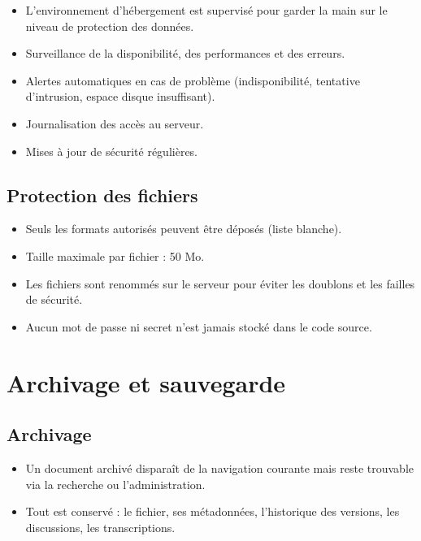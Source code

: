 \documentclass[a4paper,12pt,french]{article}
\begin{document}
\begin{itemize}[leftmargin=1.5em]
  \item L'environnement d'hébergement est supervisé pour garder la main sur le niveau de protection des données.
  \item Surveillance de la disponibilité, des performances et des erreurs.
  \item Alertes automatiques en cas de problème (indisponibilité, tentative d'intrusion, espace disque insuffisant).
  \item Journalisation des accès au serveur.
  \item Mises à jour de sécurité régulières.
\end{itemize}

\subsection{Protection des fichiers}

\begin{itemize}[leftmargin=1.5em]
  \item Seuls les formats autorisés peuvent être déposés (liste blanche).
  \item Taille maximale par fichier : 50 Mo.
  \item Les fichiers sont renommés sur le serveur pour éviter les doublons et les failles de sécurité.
  \item Aucun mot de passe ni secret n'est jamais stocké dans le code source.
\end{itemize}


\section{Archivage et sauvegarde}

\subsection{Archivage}

\begin{itemize}[leftmargin=1.5em]
  \item Un document archivé disparaît de la navigation courante mais reste trouvable via la recherche ou l'administration.
  \item Tout est conservé : le fichier, ses métadonnées, l'historique des versions, les discussions, les transcriptions.
\end{itemize}
\end{document}
